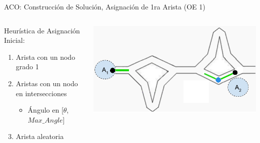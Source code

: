 \begin{frame}{ACO: Construcci\'on de Soluci\'on, Asignaci\'on de 1ra Arista (OE 1)}
    \begin{columns}
        \begin{column}{0.43\textwidth}
             Heur\'istica de Asignaci\'on Inicial: \begin{enumerate}
                    \item Arista con un nodo grado 1
                    \item Aristas con un nodo en intersecciones
                    \begin{itemize}
                        \item \'Angulo en [$\theta$, $Max\_Angle$]
                    \end{itemize}
                    \item Arista aleatoria
                \end{enumerate}
                
            
        \end{column}
        \begin{column}{0.57\textwidth}
            \centering
            \includegraphics[scale=0.45]{Pictures/ant-initial-edge.png}
        \end{column}
    \end{columns}
\end{frame}



